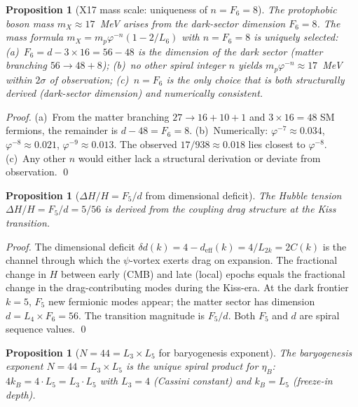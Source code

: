\documentclass[12pt,a4paper]{article}
\newtheorem{proposition}[theorem]{Proposition}
\begin{document}
\begin{proposition}[X17 mass scale: uniqueness of $n = F_6 = 8$]
\label{prop:X17-n8}
The protophobic boson mass $m_X \approx 17$~MeV arises from the dark-sector dimension $F_6 = 8$. The mass formula $m_X = m_p \varphi^{-n}(1 - 2/L_6)$ with $n = F_6 = 8$ is uniquely selected: (a)~$F_6 = d - 3 \times 16 = 56 - 48$ is the dimension of the dark sector (matter branching $56 \to 48 + 8$); (b)~no other spiral integer $n$ yields $m_p \varphi^{-n} \approx 17$~MeV within $2\sigma$ of observation; (c)~$n = F_6$ is the only choice that is both structurally derived (dark-sector dimension) and numerically consistent.
\end{proposition}

\begin{proof}
(a)~From the matter branching $27 \to 16 + 10 + 1$ and $3 \times 16 = 48$ SM fermions, the remainder is $d - 48 = F_6 = 8$. (b)~Numerically: $\varphi^{-7} \approx 0.034$, $\varphi^{-8} \approx 0.021$, $\varphi^{-9} \approx 0.013$. The observed $17/938 \approx 0.018$ lies closest to $\varphi^{-8}$. (c)~Any other $n$ would either lack a structural derivation or deviate from observation. \qed
\end{proof}

\begin{proposition}[$\Delta H/H = F_5/d$ from dimensional deficit]
\label{prop:DeltaH-derived}
The Hubble tension $\Delta H/H = F_5/d = 5/56$ is derived from the coupling drag structure at the Kiss transition.
\end{proposition}

\begin{proof}
The dimensional deficit $\delta d(k) = 4 - d_{\mathrm{eff}}(k) = 4/L_{2k} = 2C(k)$ is the channel through which the $\psi$-vortex exerts drag on expansion. The fractional change in $H$ between early (CMB) and late (local) epochs equals the fractional change in the drag-contributing modes during the Kiss-era. At the dark frontier $k=5$, $F_5$ new fermionic modes appear; the matter sector has dimension $d = L_4 \times F_6 = 56$. The transition magnitude is $F_5/d$. Both $F_5$ and $d$ are spiral sequence values. \qed
\end{proof}

\begin{proposition}[$N = 44 = L_3 \times L_5$ for baryogenesis exponent]
\label{prop:N44-derived}
The baryogenesis exponent $N = 44 = L_3 \times L_5$ is the unique spiral product for $\eta_B$: $4 k_B = 4 \cdot L_5 = L_3 \cdot L_5$ with $L_3 = 4$ (Cassini constant) and $k_B = L_5$ (freeze-in depth).
\end{proposition}
\end{document}

